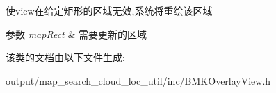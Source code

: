 使view在给定矩形的区域无效,系统将重绘该区域 
\begin{DoxyParams}{参数}
{\em map\+Rect} & 需要更新的区域 \\
\hline
\end{DoxyParams}


该类的文档由以下文件生成\+:\begin{DoxyCompactItemize}
\item 
output/map\+\_\+search\+\_\+cloud\+\_\+loc\+\_\+util/inc/B\+M\+K\+Overlay\+View.\+h\end{DoxyCompactItemize}
